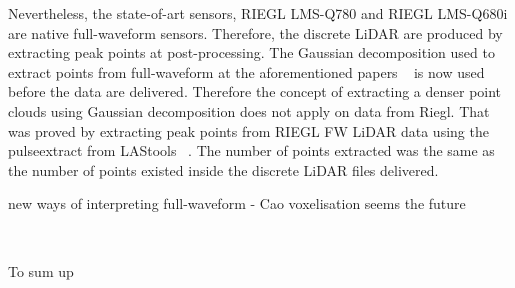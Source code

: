 \documentclass{subfiles}
\begin{document}
	\par Nevertheless, the state-of-art sensors, RIEGL LMS-Q780 and RIEGL LMS-Q680i are native full-waveform sensors. Therefore, the discrete LiDAR are produced by extracting peak points at post-processing. The Gaussian decomposition used to extract points from full-waveform at the aforementioned papers ~\cite{bibid} is now used  before the data are delivered. Therefore the concept of extracting a denser point clouds using Gaussian decomposition does not apply on data from Riegl. That was proved by extracting peak points from RIEGL FW LiDAR data using the pulseextract from LAStools ~\cite{LAStools}. The number of points extracted was the same as the number of points existed inside the discrete LiDAR files delivered.

	
	\par new ways of interpreting full-waveform - Cao voxelisation seems the future
	
	~\cite{Cao2016} 
	
    \par To sum up 
    
\end{document}
